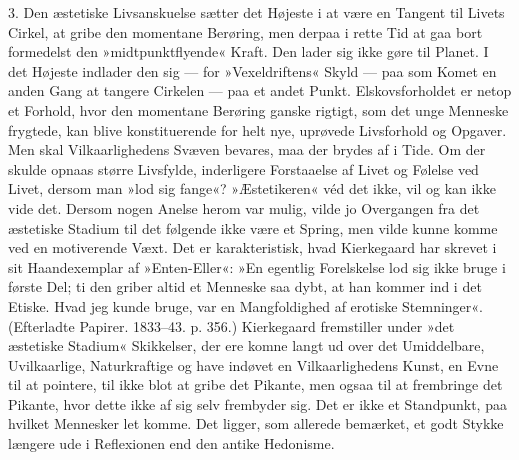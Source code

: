 \documentclass[12pt,a4paper,openany]{book}
\newcommand{\opage}[1]{\marginnote{\footnotesize\textit{[#1]}}}
\begin{document}
3. Den æstetiske Livsanskuelse sætter det Højeste
i at være en Tangent til Livets Cirkel, at gribe den
momentane Berøring, men derpaa i rette Tid at gaa bort
formedelst den »midtpunktflyende« Kraft. Den lader sig
ikke gøre til Planet. I det Højeste indlader den sig ---
for »Vexeldriftens« Skyld --- paa som Komet en anden
Gang at tangere Cirkelen --- paa et andet Punkt. Elskovsforholdet
er netop et Forhold, hvor den momentane Berøring
ganske rigtigt, som det unge Menneske frygtede,
kan blive konstituerende for helt nye, uprøvede Livsforhold
og Opgaver. Men skal Vilkaarlighedens Svæven
bevares, maa der brydes af i Tide. Om der skulde opnaas
større Livsfylde, inderligere Forstaaelse af Livet og
Følelse ved Livet, dersom man »lod sig fange«? »Æstetikeren«
véd det ikke, vil og kan ikke vide det. Dersom
nogen Anelse herom var mulig, vilde jo Overgangen fra
det æstetiske Stadium til det følgende ikke være et
Spring, men vilde kunne komme ved en motiverende
Væxt. Det er karakteristisk, hvad Kierkegaard har
skrevet i sit Haandexemplar af »Enten-Eller«: »En
egentlig Forelskelse lod sig ikke bruge i første Del; ti
den griber altid et Menneske saa dybt, at han kommer
ind i det Etiske. Hvad jeg kunde bruge, var en Mangfoldighed
af erotiske Stemninger«. (Efterladte Papirer.
1833--43. p. 356.) Kierkegaard fremstiller under »det
æstetiske Stadium« Skikkelser, der ere komne langt ud
over det Umiddelbare, Uvilkaarlige, Naturkraftige og
have indøvet en Vilkaarlighedens Kunst, en Evne til at
pointere, til ikke blot at gribe det Pikante, men ogsaa
til at frembringe det Pikante, hvor dette ikke af sig selv
\opage{89}frembyder sig. Det er ikke et Standpunkt, paa hvilket
Mennesker let komme. Det ligger, som allerede bemærket,
et godt Stykke længere ude i Reflexionen end den antike
Hedonisme.
\end{document}
